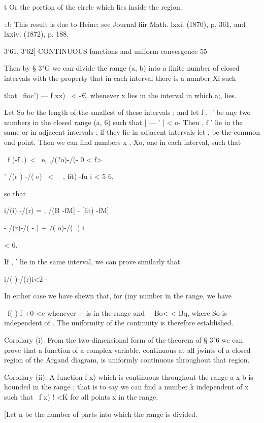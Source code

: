 t Or the portion of the circle which lies inside the region. 

:J: This result is due to Heine; see Journal fiir Math. lxxi. (1870), p. 361, and lxxiv. (1872), 
p. 188. 



3'61, 3'62] CONTINUOUS functions and uniform convergence 55 

Then by § 3"G we can divide the range (a, b) into a finite number of closed 
intervals with the property that in each interval there is a number Xi such 

that \ fioc') — f xx) \ < -€, whenever x lies in the interval in which a;, lies. 

Let So be the length of the smallest of these intervals ; and let f , |' be 
any two numbers in the closed range (a, 6) such that |   —  ' | <  o- Then 
 , f ' lie in the same or in adjacent intervals ; if they lie in adjacent intervals 
let  , be the common end point. Then we can find numbers x , Xo, one in 
each interval, such that 

\ f  )-f  .)\ < \ e, ,/(?o)-/(- 0 < f> 

' /(r ) -/( e) \ < \ \  , fit) -fu  i < 5 6, 

so that 

i/(i) -/(r) = ,  /(B -fM] - [fit) -fM] 

- /(r)-/( -.)  +  /( o)-/( .) i 

< 6. 

If  ,  ' lie in the same interval, we can prove similarly that 

i/( )-/(r)i<2 - 

In either case we have shewn that, for (iny number   in the range, 
we have 

\ f( )-f  +0 <e 
whenever  +   is in the range and —Bo<  < Bq, where So is independent of  . 
The uniformity of the continuity is therefore established. 

Corollary (i). From the two-dimensional form of the theorem of § 3"6 we can prove 
that a function of a complex variable, continuous at all jwints of a closed region of the 
Argand diagram, is uniformly continuous throughout that region. 

Corollary (ii). A function f  x) which is continuous throughout the range a x b is 
hounded in the range ; that is to say we can find a number k independent of x such that 
\ f x) ! <K for all points x in the range. 

[Let n be the number of parts into which the range is divided. 

